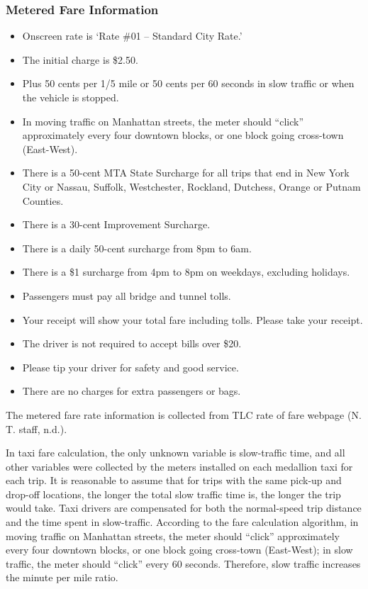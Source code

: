 \documentclass[12pt,twoside]{reedthesis}
\providecommand{\tightlist}{%
  \setlength{\itemsep}{0pt}\setlength{\parskip}{0pt}}
\theoremstyle{definition}
\theoremstyle{definition}
\theoremstyle{definition}
\theoremstyle{remark}
\begin{document}
\subsubsection{Metered Fare Information}\label{metered-fare-information}
\begin{itemize}
\tightlist
\item
  Onscreen rate is `Rate \#01 -- Standard City Rate.'
\item
  The initial charge is \$2.50.
\item
  Plus 50 cents per 1/5 mile or 50 cents per 60 seconds in slow traffic
  or when the vehicle is stopped.
\item
  In moving traffic on Manhattan streets, the meter should ``click''
  approximately every four downtown blocks, or one block going
  cross-town (East-West).
\item
  There is a 50-cent MTA State Surcharge for all trips that end in New
  York City or Nassau, Suffolk, Westchester, Rockland, Dutchess, Orange
  or Putnam Counties.
\item
  There is a 30-cent Improvement Surcharge.
\item
  There is a daily 50-cent surcharge from 8pm to 6am.
\item
  There is a \$1 surcharge from 4pm to 8pm on weekdays, excluding
  holidays.
\item
  Passengers must pay all bridge and tunnel tolls.
\item
  Your receipt will show your total fare including tolls. Please take
  your receipt.
\item
  The driver is not required to accept bills over \$20.
\item
  Please tip your driver for safety and good service.
\item
  There are no charges for extra passengers or bags.
\end{itemize}
The metered fare rate information is collected from TLC rate of fare
webpage (N. T. staff, n.d.).

In taxi fare calculation, the only unknown variable is slow-traffic
time, and all other variables were collected by the meters installed on
each medallion taxi for each trip. It is reasonable to assume that for
trips with the same pick-up and drop-off locations, the longer the total
slow traffic time is, the longer the trip would take. Taxi drivers are
compensated for both the normal-speed trip distance and the time spent
in slow-traffic. According to the fare calculation algorithm, in moving
traffic on Manhattan streets, the meter should ``click'' approximately
every four downtown blocks, or one block going cross-town (East-West);
in slow traffic, the meter should ``click'' every 60 seconds. Therefore,
slow traffic increases the minute per mile ratio.
\end{document}
